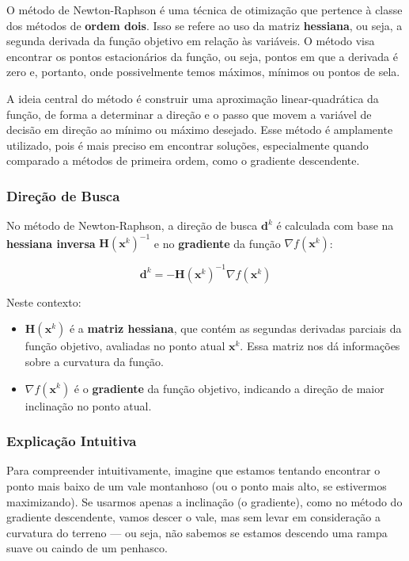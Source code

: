 \documentclass[a4paper, 12pt]{article}
\begin{document}
O método de Newton-Raphson é uma técnica de otimização que pertence à classe dos métodos de \textbf{ordem dois}. Isso se refere ao uso da matriz \textbf{hessiana}, ou seja, a segunda derivada da função objetivo em relação às variáveis. O método visa encontrar os pontos estacionários da função, ou seja, pontos em que a derivada é zero e, portanto, onde possivelmente temos máximos, mínimos ou pontos de sela.

A ideia central do método é construir uma aproximação linear-quadrática da função, de forma a determinar a direção e o passo que movem a variável de decisão em direção ao mínimo ou máximo desejado. Esse método é amplamente utilizado, pois é mais preciso em encontrar soluções, especialmente quando comparado a métodos de primeira ordem, como o gradiente descendente.

\subsubsection{Direção de Busca}

No método de Newton-Raphson, a direção de busca $\mathbf{d}^k$ é calculada com base na \textbf{hessiana inversa} $\mathbf{H}(\mathbf{x}^k)^{-1}$ e no \textbf{gradiente} da função $\nabla f(\mathbf{x}^k)$:

\begin{equation}
    \mathbf{d}^k = -\mathbf{H}(\mathbf{x}^k)^{-1} \nabla f(\mathbf{x}^k)
\end{equation}

Neste contexto:
\begin{itemize}
    \item $\mathbf{H}(\mathbf{x}^k)$ é a \textbf{matriz hessiana}, que contém as segundas derivadas parciais da função objetivo, avaliadas no ponto atual $\mathbf{x}^k$. Essa matriz nos dá informações sobre a curvatura da função.
    \item $\nabla f(\mathbf{x}^k)$ é o \textbf{gradiente} da função objetivo, indicando a direção de maior inclinação no ponto atual.
\end{itemize}

\subsubsection{Explicação Intuitiva}

Para compreender intuitivamente, imagine que estamos tentando encontrar o ponto mais baixo de um vale montanhoso (ou o ponto mais alto, se estivermos maximizando). Se usarmos apenas a inclinação (o gradiente), como no método do gradiente descendente, vamos descer o vale, mas sem levar em consideração a curvatura do terreno — ou seja, não sabemos se estamos descendo uma rampa suave ou caindo de um penhasco.
\end{document}
